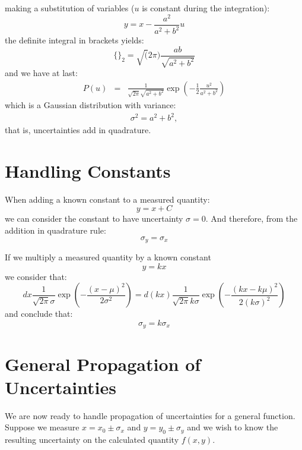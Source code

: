 \documentclass[12pt,oneside]{book}
\begin{document}
making a substitution of variables ($u$ is constant during the integration):
\begin{equation*}
y = x-\frac{a^2}{a^2+b^2}u
\end{equation*}
the definite integral in brackets yields:
\begin{equation}
\{\}_2 = \sqrt(2 \pi) \frac{a b}{\sqrt{a^2+b^2}}
\end{equation}
and we have at last:
\begin{eqnarray*}
P(u) &=& \frac{1}{\sqrt{2\pi} \sqrt{a^2+b^2}}  \exp \left( -\frac{1}{2} \frac{u^2}{a^2+b^2} \right)
\end{eqnarray*}
which is a Gaussian distribution with variance:
\begin{eqnarray*}
\sigma^2 = a^2 + b^2,
\end{eqnarray*}
that is, uncertainties add in quadrature.

\section{Handling Constants}

When adding a known constant to a measured quantity:
\begin{equation*}
y = x + C
\end{equation*}
we can consider the constant to have uncertainty $\sigma=0$.  And therefore, from the addition in quadrature rule:
\begin{equation*}
\sigma_y = \sigma_x
\end{equation*}

If we multiply a measured quantity by a known constant 
\begin{equation*}
y = k x 
\end{equation*}
we consider that:
\begin{displaymath}
dx \frac{1}{\sqrt{2\pi} \sigma} \exp\left(-\frac{(x-\mu)^2}{2\sigma^2}\right) = d(kx) \frac{1}{\sqrt{2\pi} k\sigma} \exp\left(-\frac{(kx-k\mu)^2}{2(k\sigma)^2}\right)
\end{displaymath}
and conclude that:
\begin{equation*}
\sigma_y = k \sigma_x
\end{equation*}

\section{General Propagation of Uncertainties}
We are now ready to handle propagation of uncertainties for a general function.  Suppose we measure $x = x_0 \pm \sigma_x$ and $y = y_0 \pm \sigma_y$ and we wish to know the resulting uncertainty on the calculated quantity $f(x,y)$.
\end{document}
